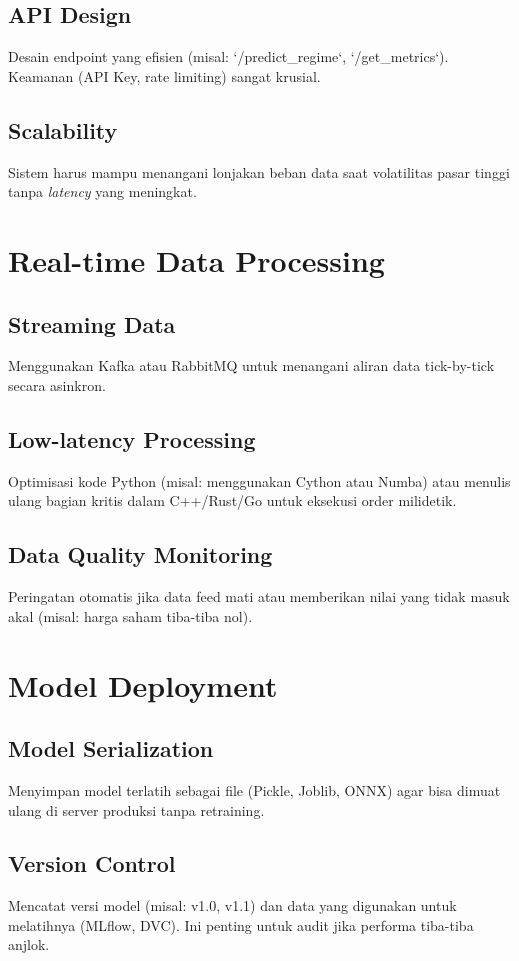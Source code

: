 \documentclass[12pt,a4paper]{book}
\begin{document}
\subsection{API Design}
Desain endpoint yang efisien (misal: `/predict_regime`, `/get_metrics`). Keamanan (API Key, rate limiting) sangat krusial.

\subsection{Scalability}
Sistem harus mampu menangani lonjakan beban data saat volatilitas pasar tinggi tanpa \textit{latency} yang meningkat.

\section{Real-time Data Processing}
\subsection{Streaming Data}
Menggunakan Kafka atau RabbitMQ untuk menangani aliran data tick-by-tick secara asinkron.

\subsection{Low-latency Processing}
Optimisasi kode Python (misal: menggunakan Cython atau Numba) atau menulis ulang bagian kritis dalam C++/Rust/Go untuk eksekusi order milidetik.

\subsection{Data Quality Monitoring}
Peringatan otomatis jika data feed mati atau memberikan nilai yang tidak masuk akal (misal: harga saham tiba-tiba nol).

\section{Model Deployment}
\subsection{Model Serialization}
Menyimpan model terlatih sebagai file (Pickle, Joblib, ONNX) agar bisa dimuat ulang di server produksi tanpa retraining.

\subsection{Version Control}
Mencatat versi model (misal: v1.0, v1.1) dan data yang digunakan untuk melatihnya (MLflow, DVC). Ini penting untuk audit jika performa tiba-tiba anjlok.
\end{document}
